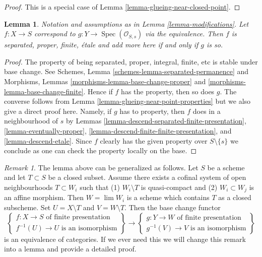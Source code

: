 \documentclass{stacks-project}
\theoremstyle{plain}
\newtheorem{lemma}[subsection]{Lemma}
\theoremstyle{definition}
\theoremstyle{remark}
\newtheorem{remark}[subsection]{Remark}
\numberwithin{equation}{subsection}
\def\lim{\mathop{\mathrm{lim}}\nolimits}
\def\Spec{\mathop{\mathrm{Spec}}}
\begin{document}
\begin{proof}
This is a special case of Lemma \ref{lemma-glueing-near-closed-point}.
\end{proof}

\begin{lemma}
\label{lemma-modifications-properties}
Notation and assumptions as in Lemma \ref{lemma-modifications}.
Let $f : X \to S$ correspond to $g : Y \to \Spec(\mathcal{O}_{S, s})$
via the equivalence. Then $f$ is separated, proper, finite, \'etale
and add more here if and only if $g$ is so.
\end{lemma}

\begin{proof}
The property of being separated, proper, integral, finite, etc
is stable under base change. See
Schemes, Lemma \ref{schemes-lemma-separated-permanence}
and
Morphisms, Lemmas \ref{morphisms-lemma-base-change-proper} and
\ref{morphisms-lemma-base-change-finite}.
Hence if $f$ has the property, then so does $g$.
The converse follows from Lemma \ref{lemma-glueing-near-point-properties}
but we also give a direct proof here.
Namely, if $g$ has to property, then $f$ does in a neighbourhood of $s$ by
Lemmas \ref{lemma-descend-separated-finite-presentation},
\ref{lemma-eventually-proper},
\ref{lemma-descend-finite-finite-presentation}, and
\ref{lemma-descend-etale}.
Since $f$ clearly has the given property over $S \setminus \{s\}$
we conclude as one can check the property locally on the base.
\end{proof}

\begin{remark}
\label{remark-more-general-modification}
The lemma above can be generalized as follows. Let $S$ be a scheme and
let $T \subset S$ be a closed subset. Assume there exists a cofinal
system of open neighbourhoods $T \subset W_i$ such that
(1) $W_i \setminus T$ is quasi-compact and
(2) $W_i \subset W_j$ is an affine morphism.
Then $W = \lim W_i$ is a scheme which contains $T$
as a closed subscheme. Set $U = X \setminus T$ and $V = W \setminus T$.
Then the base change functor
$$
\left\{
\begin{matrix}
f : X \to S\text{ of finite presentation} \\
f^{-1}(U) \to U\text{ is an isomorphism}
\end{matrix}
\right\}
\longrightarrow
\left\{
\begin{matrix}
g : Y \to W\text{ of finite presentation} \\
g^{-1}(V) \to V\text{ is an isomorphism}
\end{matrix}
\right\}
$$
is an equivalence of categories. If we ever need this we will
change this remark into a lemma and provide a detailed proof.
\end{remark}
\end{document}
